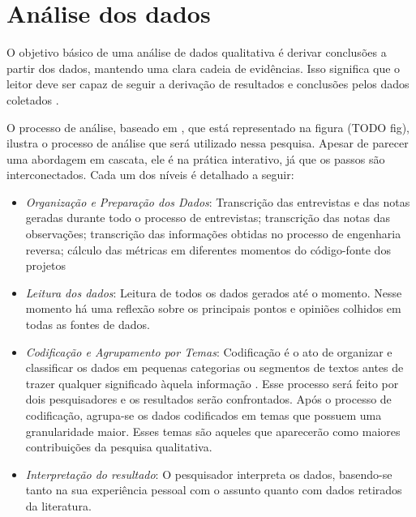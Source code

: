 \section{Análise dos dados}
\label{sec:planejamento-analise}

O objetivo básico de uma análise de dados qualitativa é derivar conclusões a partir dos dados, mantendo uma clara cadeia de evidências.
Isso significa que o leitor deve ser capaz de seguir a derivação de resultados e conclusões pelos dados coletados \cite{yin}.

O processo de análise, baseado em \cite{creswell}, que está representado na figura (TODO fig), ilustra o processo de análise que será utilizado nessa pesquisa. Apesar de parecer uma abordagem em cascata, ele é na prática interativo, já que os passos são interconectados. Cada um dos níveis é detalhado a seguir:

\begin{itemize}

	\item \textit{Organização e Preparação dos Dados}: Transcrição das entrevistas e das notas geradas durante todo o processo de entrevistas; transcrição das notas das observações; transcrição das informações obtidas no processo de engenharia reversa; cálculo das métricas em diferentes momentos do código-fonte dos projetos
	
	\item \textit{Leitura dos dados}: Leitura de todos os dados gerados até o momento. Nesse momento há uma reflexão sobre os principais pontos e opiniões colhidos em todas as fontes de dados.
	
	\item \textit{Codificação e Agrupamento por Temas}:	Codificação é o ato de organizar e classificar os dados em pequenas categorias ou segmentos de textos antes de trazer qualquer significado àquela informação \cite{rossman}. Esse processo será feito por dois pesquisadores e os resultados serão confrontados. Após o processo de codificação, agrupa-se os dados codificados em temas que possuem uma granularidade maior. Esses temas são aqueles que aparecerão como maiores contribuições da pesquisa qualitativa.
	
	\item \textit{Interpretação do resultado}: O pesquisador interpreta os dados, basendo-se tanto na sua experiência pessoal com o assunto quanto com dados retirados da literatura.

\end{itemize}
 
